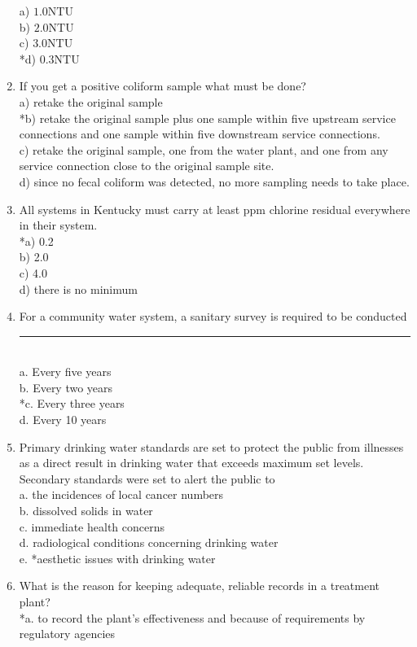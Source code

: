 \begin{enumerate}
a) $1.0 \mathrm{NTU}$\\
b) $2.0 \mathrm{NTU}$\\
c) $3.0 \mathrm{NTU}$\\
*d) $0.3 \mathrm{NTU}$\\
\item If you get a positive coliform sample what must be done?\\
a) retake the original sample\\
*b) retake the original sample plus one sample within five upstream service connections and one sample within five downstream service connections.\\
c) retake the original sample, one from the water plant, and one from any service connection close to the original sample site.\\
d) since no fecal coliform was detected, no more sampling needs to take place.\\
\item All systems in Kentucky must carry at least ppm chlorine residual everywhere in their system.\\
*a) 0.2\\
b) 2.0\\
c) 4.0\\
d) there is no minimum\\
\item For a community water system, a sanitary survey is required to be conducted \rule{1.5cm}{0.5pt}\\
a. Every five years\\
b. Every two years\\
*c. Every three years\\
d. Every 10 years
\item Primary drinking water standards are set to protect the public from illnesses as a direct result in drinking water that exceeds maximum set levels. Secondary standards were set to alert the public to\\
a. the incidences of local cancer numbers\\
b. dissolved solids in water\\
c. immediate health concerns\\
d. radiological conditions concerning drinking water\\
e. *aesthetic issues with drinking water\\
\item What is the reason for keeping adequate, reliable records in a treatment plant?\\
*a. to record the plant's effectiveness and because of requirements by regulatory agencies\\

\end{enumerate}
